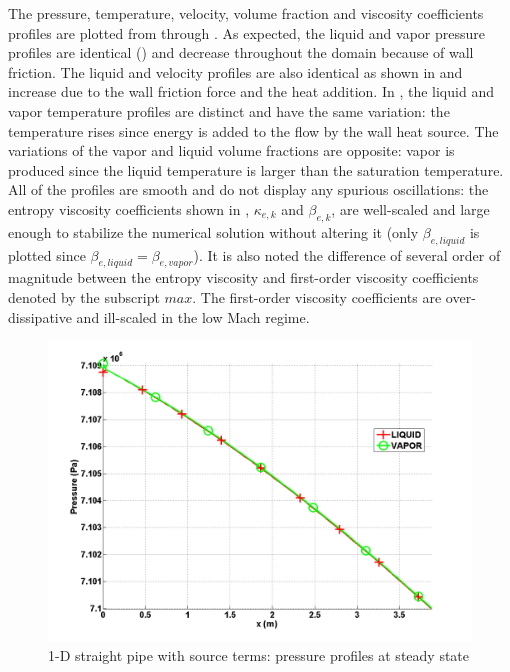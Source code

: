 The pressure, temperature, velocity, volume fraction and viscosity coefficients profiles are plotted from  through . As expected, the liquid and vapor pressure profiles are identical () and decrease throughout the domain because of wall friction. The liquid and velocity profiles are also identical as shown in  and increase due to the wall friction force and the heat addition. In , the liquid and vapor temperature profiles are distinct and have the same variation: the temperature rises since energy is added to the flow by the wall heat source. The variations of the vapor and liquid volume fractions are opposite: vapor is produced since the liquid temperature is larger than the saturation temperature. All of the profiles are smooth and do not display any spurious oscillations: the entropy viscosity coefficients shown in , $\kappa_{e,k}$ and $\beta_{e,k}$, are well-scaled and large enough to stabilize the numerical solution without altering it (only $\beta_{e,liquid}$ is plotted since $\beta_{e,liquid}=\beta_{e,vapor}$). It is also noted the difference of several order of magnitude between the entropy viscosity and first-order viscosity coefficients denoted by the subscript $max$. The first-order viscosity coefficients are over-dissipative and ill-scaled in the low Mach regime.
%
        \begin{figure}[H]
                \centering
                \includegraphics[width=\textwidth]{figures/SEM/ANS_WINTER_2014_7Eqn_pressure.png}
                \caption{1-D straight pipe with source terms: pressure profiles at steady state}
                \label{fig:pressure}
        \end{figure}%
